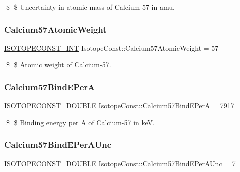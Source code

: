 \$ \$ Uncertainty in atomic mass of Calcium-\/57 in amu. \mbox{\label{group___isotope_const-_calcium-_ca57_ga9ed80ddfa36e22f8c7cd504803e608b2}} 
\subsubsection{\texorpdfstring{Calcium57\+Atomic\+Weight}{Calcium57AtomicWeight}}
{\footnotesize\ttfamily \mbox{\hyperlink{group___isotope_const-_macros_ga5f18360b3e99483a35c32d789e62621c}{I\+S\+O\+T\+O\+P\+E\+C\+O\+N\+S\+T\+\_\+\+I\+NT}} Isotope\+Const\+::\+Calcium57\+Atomic\+Weight = 57}

\$ \$ Atomic weight of Calcium-\/57. \mbox{\label{group___isotope_const-_calcium-_ca57_gae633f907b2c6571fdcdd2b8bbe4c61ec}} 
\subsubsection{\texorpdfstring{Calcium57\+Bind\+E\+PerA}{Calcium57BindEPerA}}
{\footnotesize\ttfamily \mbox{\hyperlink{group___isotope_const-_macros_ga8f45a7272ce02c0b4c65c44636ed719a}{I\+S\+O\+T\+O\+P\+E\+C\+O\+N\+S\+T\+\_\+\+D\+O\+U\+B\+LE}} Isotope\+Const\+::\+Calcium57\+Bind\+E\+PerA = 7917}

\$ \$ Binding energy per A of Calcium-\/57 in keV. \mbox{\label{group___isotope_const-_calcium-_ca57_gac35a32f9b3644afc5861a213c67b053a}} 
\subsubsection{\texorpdfstring{Calcium57\+Bind\+E\+Per\+A\+Unc}{Calcium57BindEPerAUnc}}
{\footnotesize\ttfamily \mbox{\hyperlink{group___isotope_const-_macros_ga8f45a7272ce02c0b4c65c44636ed719a}{I\+S\+O\+T\+O\+P\+E\+C\+O\+N\+S\+T\+\_\+\+D\+O\+U\+B\+LE}} Isotope\+Const\+::\+Calcium57\+Bind\+E\+Per\+A\+Unc = 7}

